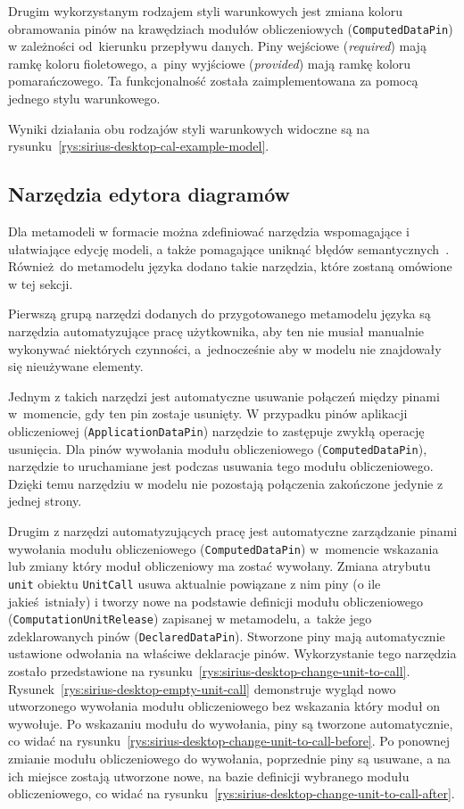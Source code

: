 Drugim wykorzystanym rodzajem styli warunkowych jest zmiana koloru obramowania
pinów na krawędziach modułów obliczeniowych (\texttt{ComputedDataPin}) w
zależności od~kierunku przepływu danych. Piny wejściowe (\emph{required}) mają
ramkę koloru fioletowego, a~piny wyjściowe (\emph{provided}) mają ramkę koloru
pomarańczowego. Ta funkcjonalność została zaimplementowana za pomocą jednego
stylu warunkowego.

Wyniki działania obu rodzajów styli warunkowych widoczne są na
rysunku~\ref{rys:sirius-desktop-cal-example-model}.

\subsection{Narzędzia edytora diagramów}\label{sec:cal-metamodel-tools}

Dla metamodeli w formacie \Ecore{} można zdefiniować narzędzia wspomagające i
ułatwiające edycję modeli, a także pomagające uniknąć
błędów semantycznych~\cite{sirius-desktop-documentation-tools}. Również do
metamodelu języka
\CAL{} dodano takie narzędzia, które zostaną omówione w tej sekcji.

Pierwszą grupą narzędzi dodanych do przygotowanego metamodelu języka \CAL{} są
narzędzia
automatyzujące pracę użytkownika, aby ten nie musiał manualnie wykonywać
niektórych czynności, a~jednocześnie aby w modelu nie znajdowały się nieużywane
elementy.

Jednym z takich narzędzi jest automatyczne usuwanie połączeń między pinami
w~momencie, gdy ten pin zostaje usunięty. W przypadku pinów aplikacji
obliczeniowej (\texttt{Application\-Data\-Pin}) narzędzie to zastępuje zwykłą
operację usunięcia. Dla pinów wywołania modułu obliczeniowego
(\texttt{ComputedDataPin}), narzędzie to uruchamiane jest podczas usuwania tego
modułu obliczeniowego. Dzięki temu narzędziu w modelu nie pozostają połączenia
zakończone jedynie z jednej strony.

Drugim z narzędzi automatyzujących pracę jest automatyczne zarządzanie
pinami wywołania modułu obliczeniowego (\texttt{ComputedDataPin}) w~momencie
wskazania lub zmiany który moduł obliczeniowy ma zostać wywołany. Zmiana
atrybutu \texttt{unit} obiektu \texttt{UnitCall} usuwa aktualnie powiązane z
nim piny (o ile jakieś istniały) i tworzy nowe na podstawie definicji modułu
obliczeniowego (\texttt{ComputationUnitRelease}) zapisanej w metamodelu,
a~także jego zdeklarowanych pinów (\texttt{DeclaredDataPin}). Stworzone piny
mają
automatycznie ustawione odwołania na właściwe deklaracje pinów.
Wykorzystanie tego narzędzia zostało przedstawione na
rysunku~\ref{rys:sirius-desktop-change-unit-to-call}.
Rysunek~\ref{rys:sirius-desktop-empty-unit-call} demonstruje wygląd nowo
utworzonego wywołania modułu obliczeniowego bez wskazania który moduł on
wywołuje. Po wskazaniu modułu do wywołania, piny są tworzone automatycznie, co
widać na rysunku~\ref{rys:sirius-desktop-change-unit-to-call-before}. Po
ponownej zmianie modułu obliczeniowego do wywołania, poprzednie piny są
usuwane, a na ich miejsce zostają utworzone nowe, na bazie definicji wybranego
modułu obliczeniowego, co widać na
rysunku~\ref{rys:sirius-desktop-change-unit-to-call-after}.


